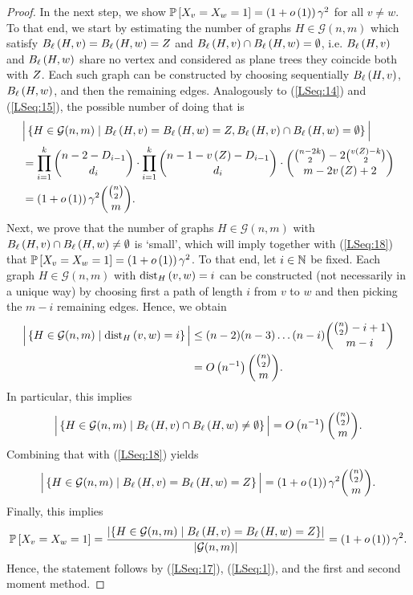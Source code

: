 \begin{proof}
In the next step, we show $\mathbb{P}\left[X_v=X_w=1\right]=\left(1+o\left(1\right)\right)\gamma^2$ for all $v\neq w$. To that end, we start by estimating the number of graphs $H\in\mathcal{G}(n,m)$ which satisfy $B_{\ell}\left(H, v\right)=B_{\ell}\left(H, w\right)=Z$ and $B_{\ell}\left(H, v\right)\cap B_{\ell}\left(H, w\right)=\emptyset$, i.e. $B_{\ell}\left(H, v\right)$ and $B_{\ell}\left(H, w\right)$ share no vertex and considered as plane trees they coincide both with $Z$. Each such graph can be constructed by choosing sequentially $B_{\ell}\left(H, v\right)$, $B_{\ell}\left(H, w\right)$, and then the remaining edges. Analogously to (\ref{LSeq:14}) and (\ref{LSeq:15}), the possible number of doing that is
\begin{align}\label{LSeq:18}
&\Big|\left\{H\in\mathcal{G}(n,m) \mid B_{\ell}\left(H, v\right)=B_{\ell}\left(H, w\right)=Z, B_{\ell}\left(H, v\right)\cap B_{\ell}\left(H, w\right)=\emptyset\right\}\Big|\nonumber
\\&=\prod_{i=1}^{k} \binom{n-2-D_{i-1}}{d_i}\cdot \prod_{i=1}^{k} \binom{n-1-v\left({Z}\right)-D_{i-1}}{d_i}\cdot\binom{\binom{n-2k}{2}-2\binom{v\left({Z}\right)-k}{2}}{m-2v\left({Z}\right)+2}\nonumber
\\
&=\left(1+o\left(1\right)\right)\gamma^2\binom{\binom{n}{2}}{m}.
\end{align}
Next, we prove that the number of graphs $H\in\mathcal{G}(n,m)$ with $B_{\ell}\left(H, v\right)\cap B_{\ell}\left(H, w\right)\neq\emptyset$ is \lq small\rq, which will imply together with (\ref{LSeq:18}) that $\mathbb{P}\left[X_v=X_w=1\right]=\left(1+o\left(1\right)\right)\gamma^2$. To that end, let $i\in\mathbb{N}$ be fixed. Each graph $H\in\mathcal{G}(n,m)$ with $\operatorname{dist}_{H}\left(v, w\right)=i$ can be constructed (not necessarily in a unique way) by choosing first a path of length $i$ from $v$ to $w$ and then picking the $m-i$ remaining edges. Hence, we obtain
\begin{align*}
\Big|\left\{H\in\mathcal{G}(n,m) \mid \operatorname{dist}_{H}\left(v, w\right)=i\right\}\Big|&\leq (n-2)(n-3)\ldots(n-i)\binom{\binom{n}{2}-i+1}{m-i}
\\&=O\left(n^{-1}\right)\binom{\binom{n}{2}}{m}.
\end{align*}
In particular, this implies
\begin{align*}
	\Big|\left\{H\in\mathcal{G}(n,m) \mid B_{\ell}\left(H, v\right)\cap B_{\ell}\left(H, w\right)\neq\emptyset\right\}\Big|=O\left(n^{-1}\right)\binom{\binom{n}{2}}{m}.
\end{align*}
Combining that with (\ref{LSeq:18}) yields
\begin{align*}
\Big|\left\{H\in\mathcal{G}(n,m) \mid B_{\ell}\left(H, v\right)=B_{\ell}\left(H, w\right)=Z\right\}\Big|=\left(1+o\left(1\right)\right)\gamma^2\binom{\binom{n}{2}}{m}.
\end{align*}
Finally, this implies
\begin{align}\label{LSeq:1}
\mathbb{P}\left[X_v=X_w=1\right]=
\frac{\left|\left\{H\in\mathcal{G}(n,m) \mid B_{\ell}\left(H, v\right)=B_{\ell}\left(H, w\right)=Z\right\}\right|}{\left|\mathcal{G}(n,m)\right|}=\left(1+o\left(1\right)\right)\gamma^2.
\end{align}
Hence, the statement follows by (\ref{LSeq:17}), (\ref{LSeq:1}), and the first and second moment method.
\end{proof}

